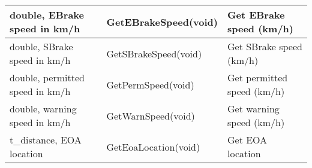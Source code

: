 \documentclass{template/openetcs_article}
\begin{document}
\begin{longtable}{|l|l|l|}
	\hline
		\begin{minipage}[t]{0.35\linewidth} double, EBrake speed in km/h	\end{minipage} 
	&	\begin{minipage}[t]{0.35\linewidth} GetEBrakeSpeed(void) \end{minipage} 
	&	\begin{minipage}[t]{0.35\linewidth} Get EBrake speed (km/h)\end{minipage} \\
	\hline
		\begin{minipage}[t]{0.35\linewidth} double, SBrake speed in km/h	\end{minipage} 
	&	\begin{minipage}[t]{0.35\linewidth} GetSBrakeSpeed(void) \end{minipage} 
	&	\begin{minipage}[t]{0.35\linewidth} Get SBrake speed (km/h)\end{minipage} \\
	\hline
		\begin{minipage}[t]{0.35\linewidth} double, permitted speed in km/h	\end{minipage} 
	&	\begin{minipage}[t]{0.35\linewidth} GetPermSpeed(void) \end{minipage} 
	&	\begin{minipage}[t]{0.35\linewidth} Get permitted speed (km/h) \end{minipage} \\
	\hline
		\begin{minipage}[t]{0.35\linewidth} double, warning speed in km/h	\end{minipage} 
	&	\begin{minipage}[t]{0.35\linewidth} GetWarnSpeed(void) \end{minipage} 
	&	\begin{minipage}[t]{0.35\linewidth} Get warning speed (km/h) \end{minipage} \\
	\hline
		\begin{minipage}[t]{0.35\linewidth} t\_distance, EOA location \end{minipage} 
	&	\begin{minipage}[t]{0.35\linewidth} GetEoaLocation(void) \end{minipage} 
	&	\begin{minipage}[t]{0.35\linewidth} Get EOA location \end{minipage} \\

\end{longtable}
\end{document}

